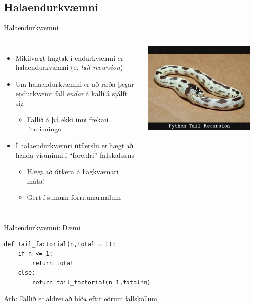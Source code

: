 \documentclass[handout]{beamer}
\begin{document}
\subsection{Halaendurkvæmni}
\begin{frame}{Halaendurkvæmni}
\begin{columns}
\begin{itemize}
 \item Mikilvægt hugtak í endurkvæmni er halaendurkvæmni (e. \emph{tail recursion})
 \item Um halaendurkvæmni er að ræða þegar endurkvæmt fall \emph{endar} á kalli á sjálft sig
 \begin{itemize}
  \item Fallið á þá ekki inni frekari útreikninga
 \end{itemize}
 \item Í halaendurkvæmri útfærslu er hægt að henda vísuninni í ``foreldri''  fallskalssins
 \begin{itemize}
  \item Hægt að útfæra á hagkvæmari máta!
  \item Gert í sumum forritunarmálum
 \end{itemize}
\end{itemize}
\pause 

\includegraphics[width=\linewidth]{Pics/pythontailrecursion}
\end{columns}
\end{frame}

\begin{frame}[fragile]{Halaendurkvæmni: Dæmi}
\begin{verbatim}
def tail_factorial(n,total = 1):
    if n <= 1:
        return total
    else:
        return tail_factorial(n-1,total*n)
\end{verbatim}
Ath: Fallið er aldrei að bíða eftir öðrum fallsköllum
\end{frame}
\end{document}

